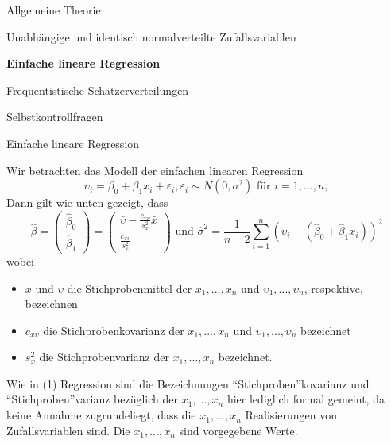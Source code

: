 \documentclass[
  8pt,
  ignorenonframetext,
]{beamer}
\providecommand{\tightlist}{%
  \setlength{\itemsep}{0pt}\setlength{\parskip}{0pt}}
\begin{document}
\begin{frame}{}
\protect\hypertarget{section-10}{}
\large
{}
\vfill

Allgemeine Theorie

Unabhängige und identisch normalverteilte Zufallsvariablen

\textbf{Einfache lineare Regression}

Frequentistische Schätzerverteilungen

Selbstkontrollfragen \vfill
\end{frame}

\begin{frame}{Einfache lineare Regression}
\protect\hypertarget{einfache-lineare-regression}{}
\small

Wir betrachten das Modell der einfachen linearen Regression
\begin{equation}\label{eq:slr}
\upsilon_i = \beta_0 + \beta_1x_i + \varepsilon_i, \varepsilon_i \sim N(0,\sigma^2) \mbox{ für } i = 1,...,n,
\end{equation} Dann gilt wie unten gezeigt, dass
\begin{equation}\label{eq:slr_estimators}
\hat{\beta}
= \begin{pmatrix} \hat{\beta}_0 \\ \hat{\beta}_1 \end{pmatrix}
= \begin{pmatrix} \bar{\upsilon} - \frac{c_{x\upsilon}}{s_x^2}\bar{x} \\ \frac{c_{x\upsilon}}{s_x^2} \end{pmatrix}
\mbox{ und }
\hat{\sigma}^2 = \frac{1}{n-2}\sum_{i=1}^n (\upsilon_i - (\hat{\beta}_0 + \hat{\beta}_1x_i))^2
\end{equation} wobei

\begin{itemize}
\tightlist
\item
  \(\bar{x}\) und \(\bar{\upsilon}\) die Stichprobenmittel der
  \(x_1,...,x_n\) und \(\upsilon_1,...,\upsilon_n\), respektive,
  bezeichnen
\item
  \(c_{x\upsilon}\) die Stichprobenkovarianz der \(x_1, ...,x_n\) und
  \(\upsilon_1,...,\upsilon_n\) bezeichnet
\item
  \(s_x^2\) die Stichprobenvarianz der \(x_1,...,x_n\) bezeichnet.
\end{itemize}

Wie in (1) Regression sind die Bezeichnungen ``Stichproben''kovarianz
und ``Stichproben''varianz bezüglich der \(x_1,...,x_n\) hier lediglich
formal gemeint, da keine Annahme zugrundeliegt, dass die \(x_1,...,x_n\)
Realisierungen von Zufallsvariablen sind. Die \(x_1,...,x_n\) sind
vorgegebene Werte.
\end{frame}
\end{document}
